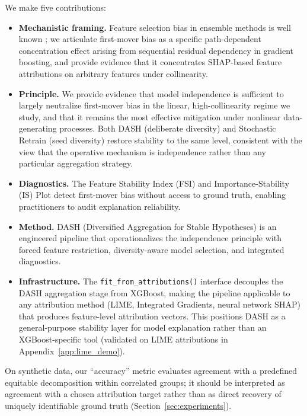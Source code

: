 \documentclass[10pt]{article}
\newcommand{\dash}{\textsc{DASH}}
\begin{document}
We make five contributions:
\begin{itemize}
  \item \textbf{Mechanistic framing.} Feature selection bias in ensemble methods
    is well known \citep{strobl2007bias, hooker2019please}; we articulate
    first-mover bias as a specific path-dependent concentration effect
    arising from sequential residual dependency in gradient
    boosting, and provide evidence that it concentrates SHAP-based feature
    attributions on arbitrary features under collinearity.
  \item \textbf{Principle.} We provide evidence that model independence is
    sufficient to largely neutralize first-mover bias in the linear,
    high-collinearity regime we study, and that it remains the most
    effective mitigation under nonlinear data-generating processes.  Both \dash{} (deliberate diversity) and
    Stochastic Retrain (seed diversity) restore stability to the same
    level, consistent with the view that the operative mechanism is independence
    rather than any particular aggregation strategy.
  \item \textbf{Diagnostics.} The Feature Stability Index (FSI) and
    Importance-Stability (IS) Plot detect first-mover bias without
    access to ground truth, enabling practitioners to audit explanation
    reliability.
  \item \textbf{Method.} \dash{} (Diversified Aggregation for Stable Hypotheses) is
    an engineered pipeline that operationalizes the independence principle
    with forced feature restriction, diversity-aware model selection,
    and integrated diagnostics.
  \item \textbf{Infrastructure.} The \texttt{fit\_from\_attributions()}
    interface decouples the DASH aggregation stage from XGBoost, making
    the pipeline applicable to any attribution method (LIME, Integrated
    Gradients, neural network SHAP) that produces feature-level
    attribution vectors.  This positions \dash{} as a general-purpose
    stability layer for model explanation rather than an XGBoost-specific tool
    (validated on LIME attributions in Appendix~\ref{app:lime_demo}).
\end{itemize}

\noindent On synthetic data, our ``accuracy'' metric evaluates agreement with a
predefined equitable decomposition within correlated groups; it should be
interpreted as agreement with a chosen attribution target rather than as
direct recovery of uniquely identifiable ground truth
(Section~\ref{sec:experiments}).
\end{document}
